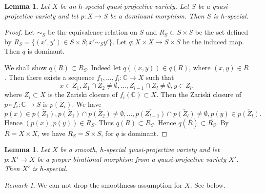 \documentclass[11pt,english]{smfart}
\theoremstyle{plain}
\newtheorem{lem}[thm]{Lemma}
\theoremstyle{definition}
\theoremstyle{remark}
\newtheorem{rem}[thm]{Remark}
\numberwithin{equation}{subsection}
\theoremstyle{plain}
\begin{document}
\begin{lem}\label{lem:202304063}
Let $X$ be an $h$-special quasi-projective variety.
Let $S$ be a quasi-projective variety and let $p:X\to S$ be a dominant morphism.
Then $S$ is $h$-special.
\end{lem}

\begin{proof}
Let $\sim_S$ be the equivalence relation on $S$ and $R_S\subset S\times S$ be the set defined by $R_S=\{(x',y')\in S\times S; x'\sim_Sy'\}$.
Let $q:X\times X\to S\times S$ be the induced map.
Then $q$ is dominant.

We shall show $q(R)\subset R_S$.
Indeed let $q((x,y))\in q(R)$, where $(x,y)\in R$.
Then there exists a sequence $f_1,\ldots,f_l:\mathbb C\to X$ such that 
$$x\in Z_1, Z_1\cap Z_2\not=\emptyset,\ldots,Z_{l-1}\cap Z_l\not=\emptyset, y\in Z_l,$$
where $Z_i\subset X$ is the Zariski closure of $f_i(\mathbb C)\subset X$.
Then the Zariski closure of $p\circ f_i:\mathbb C\to S$ is $\overline{p(Z_i)}$.
We have
$$
p(x)\in \overline{p(Z_1)}, \overline{p(Z_1)}\cap \overline{p(Z_2)}\not=\emptyset,\ldots,\overline{p(Z_{l-1})}\cap \overline{p(Z_l)}\not=\emptyset, p(y)\in \overline{p(Z_l)}.
$$
Hence $(p(x),p(y))\in R_S$.
Thus $q(R)\subset R_S$.
Hence $q(\overline{R})\subset \overline{R_S}$.
By $\overline{R}=X\times X$, we have $\overline{R_S}=S\times S$, for $q$ is dominant.
\end{proof}



\begin{lem}\label{lem:20230407}
Let $X$ be a smooth, $h$-special quasi-projective variety and let $p:X'\to X$ be a proper birational morphism from a quasi-projective variety $X'$.
Then $X'$ is $h$-special.
\end{lem}

\begin{rem}
We can not drop the smoothness assumption for $X$.
See  below.
\end{rem}
\end{document}
